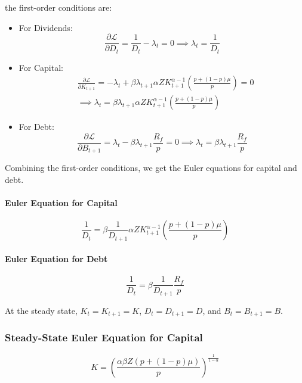 the first-order conditions are:
\begin{itemize}
    \item For Dividends:
    \begin{equation}
        \frac{\partial \mathcal{L}}{\partial D_t} = \frac{1}{D_t} - \lambda_t = 0 \implies \lambda_t = \frac{1}{D_t}
    \end{equation}
    \item For Capital:
    \begin{align}
        &\frac{\partial \mathcal{L}}{\partial K_{t+1}} = -\lambda_t + \beta \lambda_{t+1} \alpha Z K_{t+1}^{\alpha-1} 
        \left(\frac{p+(1-p)\mu}{p}\right) = 0 \\
        & \implies \lambda_t = \beta \lambda_{t+1} \alpha Z K_{t+1}^{\alpha-1} \left(\frac{p+(1-p)\mu}{p}\right)
    \end{align}
    \item For Debt:
    \begin{equation}
        \frac{\partial \mathcal{L}}{\partial B_{t+1}} = \lambda_t - \beta \lambda_{t+1} \frac{R_f}{p}= 0 \implies \lambda_t = \beta \lambda_{t+1} \frac{R_f}{p}
    \end{equation}
\end{itemize}

Combining the first-order conditions, we get the Euler equations for capital and debt.

\paragraph{Euler Equation for Capital}
\begin{equation}
\frac{1}{D_t} = \beta \frac{1}{D_{t+1}} \alpha Z K_{t+1}^{\alpha-1} \left(\frac{p+(1-p)\mu}{p}\right) \label{eq:euler-capital}
\end{equation}

\paragraph{Euler Equation for Debt}
\begin{equation}
\frac{1}{D_t} = \beta \frac{1}{D_{t+1}} \frac{R_f}{p} \label{eq:euler-debt}
\end{equation}

At the steady state, \(K_t = K_{t+1} = K\), \(D_t = D_{t+1} = D\), and \(B_t = B_{t+1} = B\).

\subsubsection{Steady-State Euler Equation for Capital}
\begin{equation}
K = \left(\frac{\alpha \beta Z (p+(1-p)\mu)}{p}\right)^{\frac{1}{1-\alpha}}
\end{equation}

